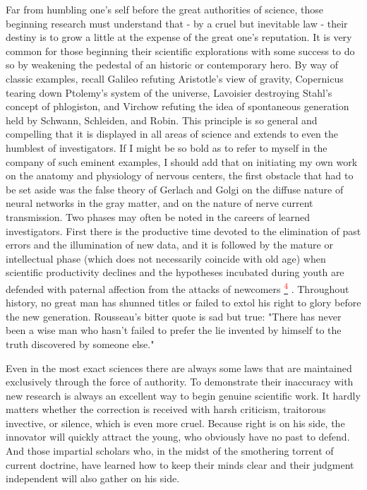 \documentclass{article}
\newcommand{\noteref}[1]{%
 \hypertarget{ref:#1}{}%
 \hyperlink{note:#1}{\textsuperscript{\textcolor{red}{#1}}}%
}
\begin{document}
Far from humbling one’s self before the great authorities of science, those beginning research must understand that - by a cruel but inevitable law - their destiny is to grow a little at the expense of the great one’s reputation. It is very common for those beginning their scientific explorations with some success to do so by weakening the pedestal of an historic or contemporary hero. By way of classic examples, recall Galileo refuting Aristotle’s view of gravity, Copernicus tearing down Ptolemy’s system of the universe, Lavoisier destroying Stahl’s concept of phlogiston, and Virchow refuting the idea of spontaneous generation held by Schwann, Schleiden, and Robin. This principle is so general and compelling that it is displayed in all areas of science and extends to even the humblest of investigators. If I might be so bold as to refer to myself in the company of such eminent examples, I should add that on initiating my own work on the anatomy and physiology of nervous centers, the first obstacle that had to be set aside was the false theory of Gerlach and Golgi on the diffuse nature of neural networks in the gray matter, and on the nature of nerve current transmission. Two phases may often be noted in the careers of learned investigators. First there is the productive time devoted to the elimination of past errors and the illumination of new data, and it is followed by the mature or intellectual phase (which does not necessarily coincide with old age) when scientific productivity declines and the hypotheses incubated during youth are defended with paternal affection from the attacks of newcomers\noteref{4}. Throughout history, no great man has shunned titles or failed to extol his right to glory before the new generation. Rousseau’s bitter quote is sad but true: "There has never been a wise man who hasn’t failed to prefer the lie invented by himself to the truth discovered by someone else."

Even in the most exact sciences there are always some laws that are maintained exclusively through the force of authority. To demonstrate their inaccuracy with new research is always an excellent way to begin genuine scientific work. It hardly matters whether the correction is received with harsh criticism, traitorous invective, or silence, which is even more cruel. Because right is on his side, the innovator will quickly attract the young, who obviously have no past to defend. And those impartial scholars who, in the midst of the smothering torrent of current doctrine, have learned how to keep their minds clear and their judgment independent will also gather on his side.
\end{document}
